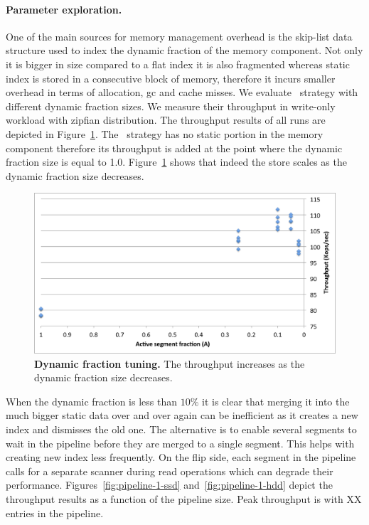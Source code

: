 \paragraph{Parameter exploration.}
One of the main sources for memory management overhead is the skip-list data structure used to index the dynamic fraction of the memory component.
Not only it is bigger in size compared to a flat index it is also fragmented whereas static index is stored in a consecutive block of memory, therefore it incurs smaller overhead in terms of allocation, gc and cache misses.
We evaluate \basic\ strategy with different dynamic fraction sizes. We measure their throughput in write-only workload with zipfian distribution.
The throughput results of all runs are depicted in  Figure~\ref{fig:dynamic-fraction}. 
The \none\ strategy has no static portion in the memory component therefore its throughput is added at the point where the dynamic fraction size is equal to 1.0.
Figure~\ref{fig:dynamic-fraction} shows that indeed the store scales as the dynamic fraction size decreases. 

\begin{figure}[htb]
\includegraphics[width=\figw]{Figs/dynamic-fraction-1.png}
\caption{{\bf Dynamic fraction tuning.} The throughput increases as the dynamic fraction size decreases.
}
\label{fig:dynamic-fraction}
\end{figure}

When the dynamic fraction is less than $10\%$ it is clear that merging it into the much bigger static data over and over again can be inefficient as it creates a new index and dismisses the old one. 
The alternative is to enable several segments to wait in the pipeline before they are merged to a single segment. This helps with creating new index less frequently.
On the flip side, each segment in the pipeline calls for a separate scanner during read operations which can degrade their performance.
Figures~\ref{fig:pipeline-1-ssd} and~\ref{fig:pipeline-1-hdd} depict the throughput results as a function of the pipeline size. Peak throughput is with XX entries in the pipeline.

